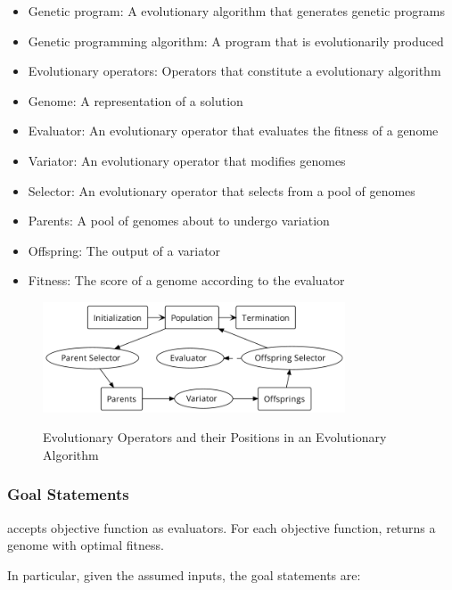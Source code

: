 \documentclass[12pt]{article}
\begin{document}
\begin{itemize}
  \item Genetic program: A evolutionary algorithm that generates genetic programs
  \item Genetic programming algorithm: A program that is evolutionarily produced
  \item Evolutionary operators: Operators that constitute a evolutionary algorithm
  \item Genome: A representation of a solution
  \item Evaluator: An evolutionary operator that evaluates the fitness of a genome
  \item Variator: An evolutionary operator that modifies genomes
  \item Selector: An evolutionary operator that selects from a pool of genomes
  \item Parents: A pool of genomes about to undergo variation
  \item Offspring: The output of a variator
  \item Fitness: The score of a genome according to the evaluator
\end{itemize}



\begin{figure}[h!]
	\begin{center}
		{
			\includegraphics[width=0.8\textwidth]{pasta}
		}
		\caption{\label{fig:evoalg} Evolutionary Operators and their Positions in an Evolutionary Algorithm}
	\end{center}
\end{figure}


\subsubsection{Goal Statements}

\thisproject{} accepts objective function as evaluators. For each objective function, \thisproject{} returns a genome with optimal fitness.

\noindent In particular, given the assumed inputs, the goal statements are:
\end{document}
